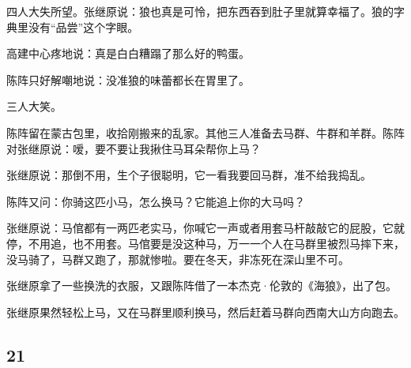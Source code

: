 \par 四人大失所望。张继原说：狼也真是可怜，把东西吞到肚子里就算幸福了。狼的字典里没有“品尝”这个字眼。
\par 高建中心疼地说：真是白白糟蹋了那么好的鸭蛋。
\par 陈阵只好解嘲地说：没准狼的味蕾都长在胃里了。
\par 三人大笑。
\par 陈阵留在蒙古包里，收拾刚搬来的乱家。其他三人准备去马群、牛群和羊群。陈阵对张继原说：嗳，要不要让我揪住马耳朵帮你上马？
\par 张继原说：那倒不用，生个子很聪明，它一看我要回马群，准不给我捣乱。
\par 陈阵又问：你骑这匹小马，怎么换马？它能追上你的大马吗？
\par 张继原说：马倌都有一两匹老实马，你喊它一声或者用套马杆敲敲它的屁股，它就停，不用追，也不用套。马倌要是没这种马，万一一个人在马群里被烈马摔下来，没马骑了，马群又跑了，那就惨啦。要在冬天，非冻死在深山里不可。
\par 张继原拿了一些换洗的衣服，又跟陈阵借了一本杰克·伦敦的《海狼》，出了包。
\par 张继原果然轻松上马，又在马群里顺利换马，然后赶着马群向西南大山方向跑去。

\subsection*{21}


